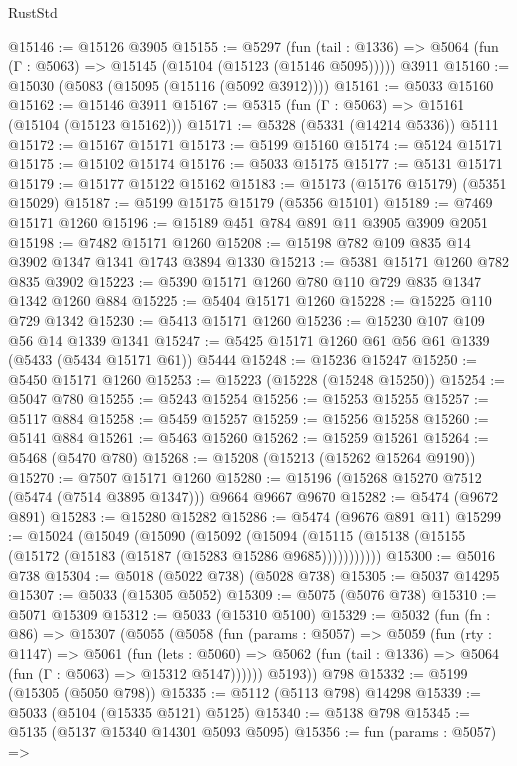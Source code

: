 \begin{lexlean}{RustStd}
\begin{coremodule}
@15146 := @15126 @3905
@15155 := @5297
    (fun (tail : @1336) => @5064 (fun (Γ : @5063) => @15145 (@15104 (@15123 (@15146 @5095)))))
    @3911
@15160 := @15030 (@5083 (@15095 (@15116 (@5092 @3912))))
@15161 := @5033 @15160
@15162 := @15146 @3911
@15167 := @5315 (fun (Γ : @5063) => @15161 (@15104 (@15123 @15162)))
@15171 := @5328 (@5331 (@14214 @5336)) @5111
@15172 := @15167 @15171
@15173 := @5199 @15160
@15174 := @5124 @15171
@15175 := @15102 @15174
@15176 := @5033 @15175
@15177 := @5131 @15171
@15179 := @15177 @15122 @15162
@15183 := @15173 (@15176 @15179) (@5351 @15029)
@15187 := @5199 @15175 @15179 (@5356 @15101)
@15189 := @7469 @15171 @1260
@15196 := @15189 @451 @784 @891 @11 @3905 @3909 @2051
@15198 := @7482 @15171 @1260
@15208 := @15198 @782 @109 @835 @14 @3902 @1347 @1341 @1743 @3894 @1330
@15213 := @5381 @15171 @1260 @782 @835 @3902
@15223 := @5390 @15171 @1260 @780 @110 @729 @835 @1347 @1342 @1260 @884
@15225 := @5404 @15171 @1260
@15228 := @15225 @110 @729 @1342
@15230 := @5413 @15171 @1260
@15236 := @15230 @107 @109 @56 @14 @1339 @1341
@15247 := @5425 @15171 @1260 @61 @56 @61 @1339 (@5433 (@5434 @15171 @61)) @5444
@15248 := @15236 @15247
@15250 := @5450 @15171 @1260
@15253 := @15223 (@15228 (@15248 @15250))
@15254 := @5047 @780
@15255 := @5243 @15254
@15256 := @15253 @15255
@15257 := @5117 @884
@15258 := @5459 @15257
@15259 := @15256 @15258
@15260 := @5141 @884
@15261 := @5463 @15260
@15262 := @15259 @15261
@15264 := @5468 (@5470 @780)
@15268 := @15208 (@15213 (@15262 @15264 @9190))
@15270 := @7507 @15171 @1260
@15280 := @15196 (@15268 @15270 @7512 (@5474 (@7514 @3895 @1347))) @9664 @9667 @9670
@15282 := @5474 (@9672 @891)
@15283 := @15280 @15282
@15286 := @5474 (@9676 @891 @11)
@15299 := @15024
    (@15049
      (@15090
        (@15092
          (@15094 (@15115 (@15138 (@15155 (@15172 (@15183 (@15187 (@15283 @15286 @9685)))))))))))
@15300 := @5016 @738
@15304 := @5018 (@5022 @738) (@5028 @738)
@15305 := @5037 @14295
@15307 := @5033 (@15305 @5052)
@15309 := @5075 (@5076 @738)
@15310 := @5071 @15309
@15312 := @5033 (@15310 @5100)
@15329 := @5032
    (fun (fn : @86) =>
    @15307
      (@5055
        (@5058
          (fun (params : @5057) =>
          @5059
            (fun (rty : @1147) =>
            @5061
              (fun (lets : @5060) =>
              @5062 (fun (tail : @1336) => @5064 (fun (Γ : @5063) => @15312 @5147))))))
        @5193))
    @798
@15332 := @5199 (@15305 (@5050 @798))
@15335 := @5112 (@5113 @798) @14298
@15339 := @5033 (@5104 (@15335 @5121) @5125)
@15340 := @5138 @798
@15345 := @5135 (@5137 @15340 @14301 @5093 @5095)
@15356 := fun (params : @5057) =>

\end{coremodule}
\end{lexlean}
